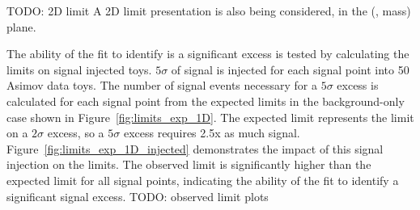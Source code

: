 
TODO: 2D limit
A 2D limit presentation is also being considered, in the (\rinv, mass) plane.

The ability of the fit to identify is a significant excess is tested by calculating the limits on signal injected toys. $5\sigma$ of signal is injected for each signal point into 50 Asimov data toys.
The number of signal events necessary for a $5\sigma$ excess is calculated for each signal point from the expected limits in the background-only case shown in Figure~\ref{fig:limits_exp_1D}.
The expected limit represents the limit on a $2\sigma$ excess, so a $5\sigma$ excess requires 2.5x as much signal.
Figure~\ref{fig:limits_exp_1D_injected} demonstrates the impact of this signal injection on the limits. 
The observed limit is significantly higher than the expected limit for all signal points, indicating the ability of the fit to identify a significant signal excess. 
TODO: observed limit plots

\clearpage



